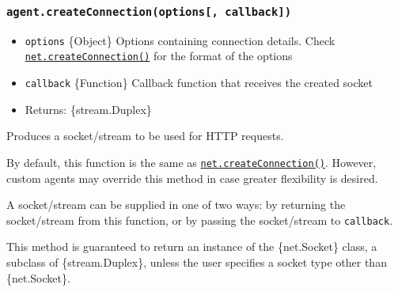 \begin{Shaded}
\begin{Highlighting}[]
\OperatorTok{=} \NormalTok{(}\NormalTok{)}\OperatorTok{;}
\OperatorTok{=} \NormalTok{(\{ }\OperatorTok{:} \NormalTok{ \})}\OperatorTok{;}
 \OperatorTok{=}\OperatorTok{;}
\OperatorTok{,}\OperatorTok{;}
\end{Highlighting}
\end{Shaded}

\subsubsection{\texorpdfstring{\texttt{agent.createConnection(options{[},\ callback{]})}}{agent.createConnection(options{[}, callback{]})}}\label{agent.createconnectionoptions-callback}

\begin{itemize}
\tightlist
\item
  \texttt{options} \{Object\} Options containing connection details.
  Check
  \href{net.md\#netcreateconnectionoptions-connectlistener}{\texttt{net.createConnection()}}
  for the format of the options
\item
  \texttt{callback} \{Function\} Callback function that receives the
  created socket
\item
  Returns: \{stream.Duplex\}
\end{itemize}

Produces a socket/stream to be used for HTTP requests.

By default, this function is the same as
\href{net.md\#netcreateconnectionoptions-connectlistener}{\texttt{net.createConnection()}}.
However, custom agents may override this method in case greater
flexibility is desired.

A socket/stream can be supplied in one of two ways: by returning the
socket/stream from this function, or by passing the socket/stream to
\texttt{callback}.

This method is guaranteed to return an instance of the \{net.Socket\}
class, a subclass of \{stream.Duplex\}, unless the user specifies a
socket type other than \{net.Socket\}.

